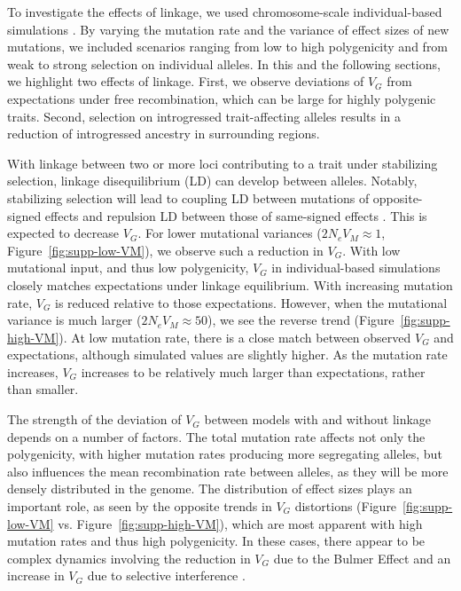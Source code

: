 \documentclass[10pt,letterpaper]{article}
\begin{document}
To investigate the effects of linkage, we used chromosome-scale
individual-based simulations \cite{thornton2019polygenic}. By varying the
mutation rate and the variance of effect sizes of new mutations, we included
scenarios ranging from low to high polygenicity and from weak to strong
selection on individual alleles. In this and the following sections, we
highlight two effects of linkage. First, we observe deviations of $V_G$ from
expectations under free recombination, which can be large for highly polygenic
traits. Second, selection on introgressed trait-affecting alleles results in a
reduction of introgressed ancestry in surrounding regions.

With linkage between two or more loci contributing to a trait under stabilizing
selection, linkage disequilibrium (LD) can develop between alleles. Notably,
stabilizing selection will lead to coupling LD between mutations of
opposite-signed effects and repulsion LD between those of same-signed effects
\cite{bulmer1971effect}. This is expected to decrease $V_G$. For lower
mutational variances ($2N_e V_M\approx1$, Figure~\ref{fig:supp-low-VM}), we
observe such a reduction in $V_G$. With low mutational input, and thus low
polygenicity, $V_G$ in individual-based simulations closely matches
expectations under linkage equilibrium. With increasing mutation rate, $V_G$ is
reduced relative to those expectations. However, when the mutational variance
is much larger ($2N_eV_M\approx 50$), we see the reverse trend
(Figure~\ref{fig:supp-high-VM}). At low mutation rate, there is a close match
between observed $V_G$ and expectations, although simulated values are slightly
higher. As the mutation rate increases, $V_G$ increases to be relatively much
larger than expectations, rather than smaller.

The strength of the deviation of $V_G$ between models with and without linkage
depends on a number of factors. The total mutation rate affects not only the
polygenicity, with higher mutation rates producing more segregating alleles,
but also influences the mean recombination rate between alleles, as they will
be more densely distributed in the genome. The distribution of effect sizes
plays an important role, as seen by the opposite trends in $V_G$ distortions
(Figure~\ref{fig:supp-low-VM} vs. Figure~\ref{fig:supp-high-VM}), which are
most apparent with high mutation rates and thus high polygenicity. In these
cases, there appear to be complex dynamics involving the reduction in $V_G$ due
to the Bulmer Effect \cite{bulmer1971effect} and an increase in $V_G$ due to
selective interference \cite{hill1966effect}.
\end{document}
